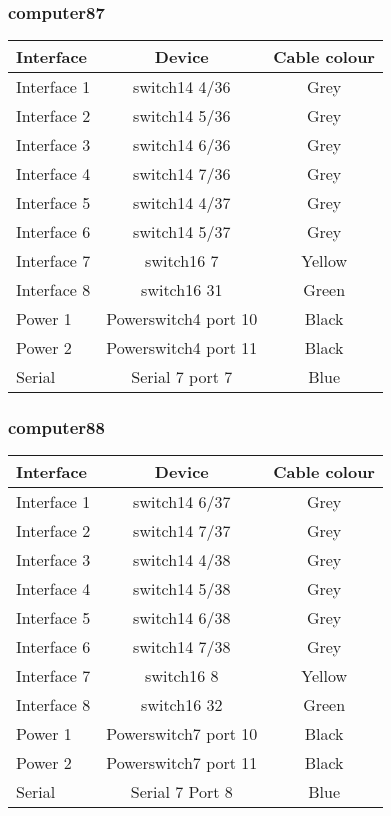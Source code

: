 \subsubsection{computer87}

\begin{table}[H]
\begin{tabular}{|l|c|c|}\hline
Interface & Device & Cable colour \\ \hline
Interface 1 & switch14 4/36 & Grey \\
Interface 2 & switch14 5/36 & Grey \\
Interface 3 & switch14 6/36 & Grey \\
Interface 4 & switch14 7/36 & Grey \\
Interface 5 & switch14 4/37 & Grey \\
Interface 6 & switch14 5/37 & Grey \\
Interface 7 & switch16 7 & Yellow \\
Interface 8 & switch16 31 & Green \\
Power 1 & Powerswitch4 port 10 & Black \\
Power 2 & Powerswitch4 port 11 & Black \\
Serial & Serial 7 port 7 & Blue \\ \hline
\end{tabular}
\end{table}

\subsubsection{computer88}

\begin{table}[H]
\begin{tabular}{|l|c|c|}\hline
Interface & Device & Cable colour \\ \hline
Interface 1 & switch14 6/37 & Grey \\
Interface 2 & switch14 7/37 & Grey \\
Interface 3 & switch14 4/38 & Grey \\
Interface 4 & switch14 5/38 & Grey \\
Interface 5 & switch14 6/38 & Grey \\
Interface 6 & switch14 7/38 & Grey \\
Interface 7 & switch16 8 & Yellow \\
Interface 8 & switch16 32 & Green \\
Power 1 & Powerswitch7 port 10 & Black \\
Power 2 & Powerswitch7 port 11 & Black \\
Serial & Serial 7 Port 8 & Blue \\ \hline
\end{tabular}
\end{table}

